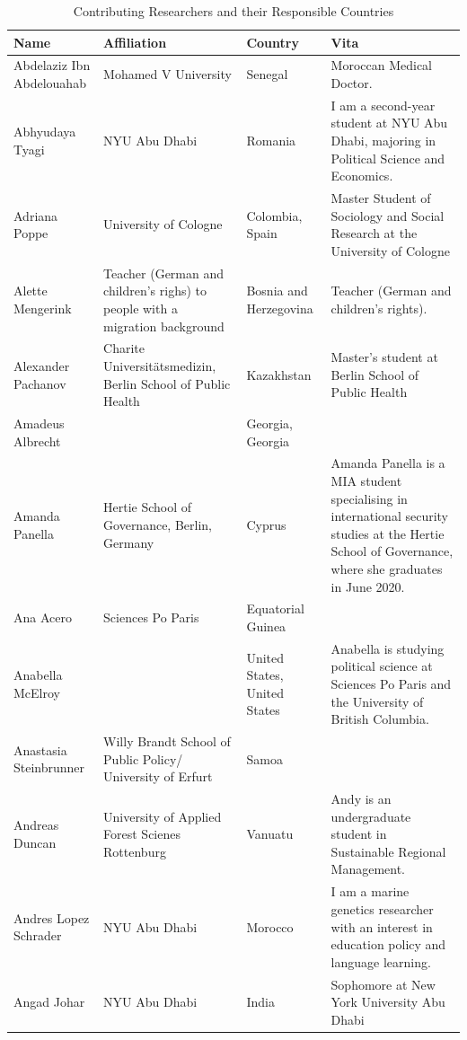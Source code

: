 \documentclass[
]{article}
\begin{document}
\begin{longtable}[t]{l>{\raggedright\arraybackslash}p{2cm}>{\raggedright\arraybackslash}p{2cm}>{\raggedright\arraybackslash}p{3cm}}
\caption{\label{tab:ratable}Contributing Researchers and their Responsible Countries}\\
\toprule
Name & Affiliation & Country & Vita\\
\midrule
\rowcolor{gray!6}  Abdelaziz Ibn Abdelouahab & Mohamed V University & Senegal & Moroccan Medical Doctor.\\
Abhyudaya Tyagi & NYU Abu Dhabi & Romania & I am a second-year student at NYU Abu Dhabi, majoring in Political Science and Economics.\\
\rowcolor{gray!6}  Adriana Poppe & University of Cologne & Colombia, Spain & Master Student of Sociology and Social Research at the University of Cologne\\
Alette Mengerink & Teacher (German and children's righs) to people with a migration background & Bosnia and Herzegovina & Teacher (German and children’s rights).\\
\rowcolor{gray!6}  Alexander Pachanov & Charite Universitätsmedizin, Berlin School of Public Health & Kazakhstan & Master's student at Berlin School of Public Health\\
\addlinespace
Amadeus Albrecht &  & Georgia, Georgia & \\
\rowcolor{gray!6}  Amanda Panella & Hertie School of Governance, Berlin, Germany & Cyprus & Amanda Panella is a MIA student specialising in international security studies at the Hertie School of Governance, where she graduates in June 2020.\\
Ana Acero & Sciences Po Paris & Equatorial Guinea & \\
\rowcolor{gray!6}  Anabella McElroy &  & United States, United States & Anabella is studying political science at Sciences Po Paris and the University of British Columbia.\\
Anastasia Steinbrunner & Willy Brandt School of Public Policy/ University of Erfurt & Samoa & \\
\addlinespace
\rowcolor{gray!6}  Andreas Duncan & University of Applied Forest Scienes Rottenburg & Vanuatu & Andy is an undergraduate student in Sustainable Regional Management.\\
Andres Lopez Schrader & NYU Abu Dhabi & Morocco & I am a marine genetics researcher with an interest in education policy and language learning.\\
\rowcolor{gray!6}  Angad Johar & NYU Abu Dhabi & India & Sophomore at New York University Abu Dhabi\\

\end{longtable}
\end{document}
